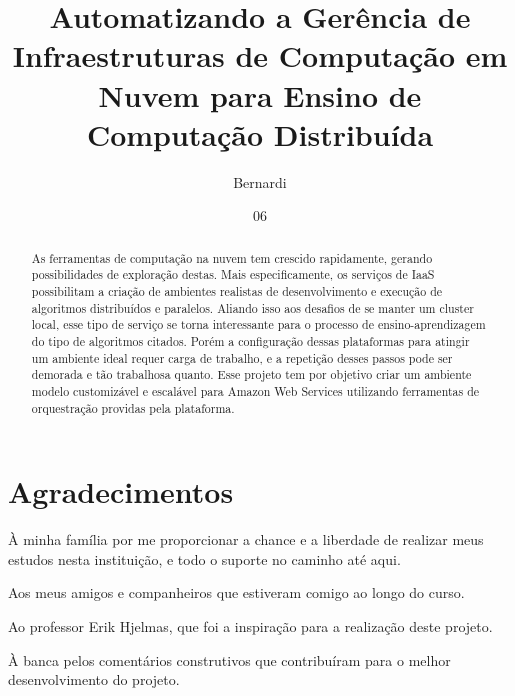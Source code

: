 \documentclass[tg]{mdtufsm}
\title{Automatizando a Gerência de Infraestruturas de Computação em Nuvem para Ensino de Computação Distribuída}
\author{Bernardi}{Cezar Augusto Contini}
\institute{Centro de Tecnologia}
\date{06}{Julho}{2016}
\begin{document}
\maketitle



\chapter*{Agradecimentos}

À minha família por me proporcionar a chance e a liberdade de realizar meus estudos nesta instituição, e todo o suporte no caminho até aqui.

Aos meus amigos e companheiros que estiveram comigo ao longo do curso.

Ao professor Erik Hjelmas, que foi a inspiração para a realização deste projeto.

À banca pelos comentários construtivos que contribuíram para o melhor desenvolvimento do projeto.


\begin{abstract}
As ferramentas de computação na nuvem tem crescido rapidamente, gerando possibilidades de exploração destas. Mais especificamente, os serviços de IaaS possibilitam a criação de ambientes realistas de desenvolvimento e execução de algoritmos distribuídos e paralelos. Aliando isso aos desafios de se manter um cluster local, esse tipo de serviço se torna interessante para o processo de ensino-aprendizagem do tipo de algoritmos citados. Porém a configuração dessas plataformas para atingir um ambiente ideal requer carga de trabalho, e a repetição desses passos pode ser demorada e tão trabalhosa quanto. Esse projeto tem por objetivo criar um ambiente modelo customizável e escalável para Amazon Web Services utilizando ferramentas de orquestração providas pela plataforma.

\end{abstract}
\end{document}
